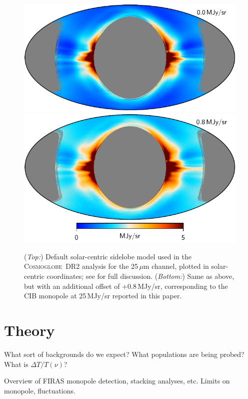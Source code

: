 \documentclass{aa}
\newcommand{\cosmoglobe}{\textsc{Cosmoglobe}}
\begin{document}
\begin{figure}
  \centering
  \includegraphics[width=\linewidth]{figs/solarmap_06_v1_mono0.pdf}\\
  \includegraphics[width=\linewidth]{figs/solarmap_06_v1_mono8.pdf}
  \caption{(\emph{Top:}) Default solar-centric sidelobe model used in the \cosmoglobe\ DR2 analysis for the 25\,$\mu$m channel, plotted in solar-centric coordinates; see \citet{paperI} for full discussion. (\emph{Bottom:}) Same as above, but with an additional offset of +0.8\,MJy/sr, corresponding to the CIB monopole at 25\,MJy/sr reported in this paper.}
  \label{fig:sidelobe}
\end{figure}


\section{Theory}
\label{sec:theory}

What sort of backgrounds do we expect? What populations are being probed? What is $\Delta T/T(\nu)$?

Overview of FIRAS monopole detection, stacking analyses, etc. Limits on monopole, fluctuations.
\end{document}
